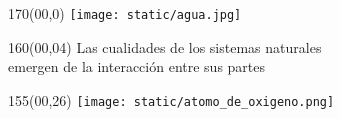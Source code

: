\documentclass[shownotes,aspectratio=169]{beamer}
\begin{document}
\begin{frame}[plain]
\begin{textblock}{170}(00,0) \centering
\texttt{[image: static/agua.jpg]}
\end{textblock}


\begin{textblock}{160}(00,04) \centering
\LARGE Las cualidades de los sistemas naturales \\ \Large
emergen de la interacción entre sus partes
\end{textblock}
\vspace{1cm} \Large



\begin{textblock}{155}(00,26) \centering
\texttt{[image: static/atomo\_de\_oxigeno.png]}
\end{textblock}

\end{frame}
\end{document}
